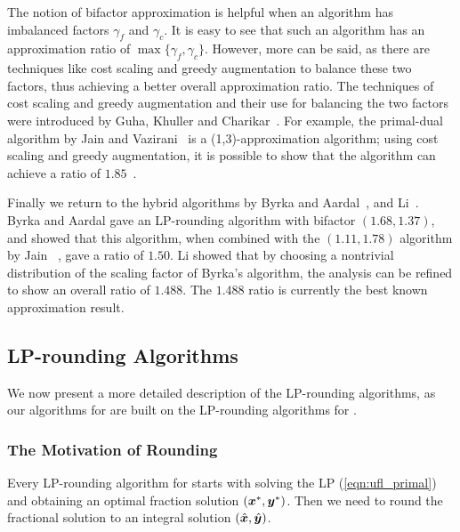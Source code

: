 \documentclass[oneside,final]{ucr}
\begin{document}
The notion of bifactor approximation is helpful when an
algorithm has imbalanced factors $\gamma_f$ and
$\gamma_c$. It is easy to see that such an algorithm has an
approximation ratio of $\max\{\gamma_f,
\gamma_c\}$. However, more can be said, as there are
techniques like cost scaling and greedy augmentation to
balance these two factors, thus achieving a better overall
approximation ratio. The techniques of cost scaling and
greedy augmentation and their use for balancing the two
factors were introduced by Guha, Khuller and
Charikar~\cite{GuhaK98, CharikarG05}. For example, the
primal-dual algorithm by Jain and Vazirani~\cite{JainV03} is
a (1,3)-approximation algorithm; using cost scaling and
greedy augmentation, it is possible to show that the
algorithm can achieve a ratio of $1.85$~\cite{CharikarG05}.

Finally we return to the hybrid algorithms by Byrka and
Aardal~\cite{ByrkaA10}, and Li~\cite{Li11}. Byrka and Aardal
gave an LP-rounding algorithm with bifactor $(1.68,1.37)$,
and showed that this algorithm, when combined with the
$(1.11,1.78)$ algorithm by Jain {\etal}~\cite{JainMMSV03},
gave a ratio of $1.50$. Li showed that by choosing a
nontrivial distribution of the scaling factor of Byrka's
algorithm, the analysis can be refined to show an overall
ratio of $1.488$. The $1.488$ ratio is currently the best
known approximation result.

\subsection{LP-rounding Algorithms}
We now present a more detailed description of the
LP-rounding algorithms, as our algorithms for {\FTFP} are
built on the LP-rounding algorithms for {\UFL}.

\subsubsection{The Motivation of Rounding}
Every LP-rounding algorithm for {\UFL} starts with solving
the LP (\ref{eqn:ufl_primal}) and obtaining an optimal
fraction solution $(\boldsymbol{x}^\ast,\boldsymbol{y}^\ast)$. Then we need to
round the fractional solution to an integral solution
$(\hat{\boldsymbol{x}},\hat{\boldsymbol{y}})$.
\end{document}

